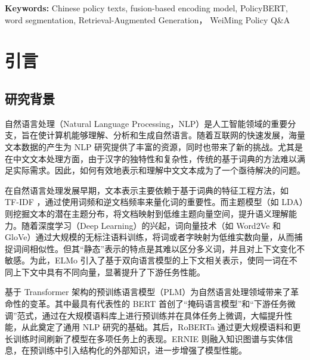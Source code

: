 \documentclass[12pt, a4paper]{ctexart}
\begin{document}
\vspace{2em} %

\textbf{Keywords:} Chinese policy texts, fusion-based encoding model, PolicyBERT, word segmentation, Retrieval-Augmented Generation， WeiMing Policy Q\&A

\newpage
\renewcommand{\cfttoctitlefont}{\hfill\Huge\bfseries} %
\renewcommand{\cftaftertoctitle}{\hfill} %
\tableofcontents %
\thispagestyle{fancy}
\newpage


\section{引言}
\subsection{研究背景}
自然语言处理（Natural Language Processing，NLP）是人工智能领域的重要分支，旨在使计算机能够理解、分析和生成自然语言。随着互联网的快速发展，海量文本数据的产生为 NLP 研究提供了丰富的资源，同时也带来了新的挑战。尤其是在中文文本处理方面，由于汉字的独特性和复杂性，传统的基于词典的方法难以满足实际需求。因此，如何有效地表示和理解中文文本成为了一个亟待解决的问题。

在自然语言处理发展早期，文本表示主要依赖于基于词典的特征工程方法，如 TF-IDF ，通过使用词频和逆文档频率来量化词的重要性\cite{SALTON1988513}。而主题模型（如 LDA）则挖掘文本的潜在主题分布，将文档映射到低维主题向量空间，提升语义理解能力\cite{10.5555/944919.944937}。随着深度学习（Deep Learning）的兴起，词向量技术（如 Word2Ve\cite{mikolov2013efficientestimationwordrepresentations} 和 GloVe\cite{pennington-etal-2014-glove}）通过大规模的无标注语料训练，将词或者字映射为低维实数向量，从而捕捉词间相似性。但其“静态”表示的特点是其难以区分多义词，并且对上下文变化不敏感。为此，ELMo 引入了基于双向语言模型的上下文相关表示，使同一词在不同上下文中具有不同向量，显著提升了下游任务性能\cite{peters-etal-2018-deep}。

基于 Transformer 架构的预训练语言模型（PLM）为自然语言处理领域带来了革命性的变革。其中最具有代表性的 BERT 首创了“掩码语言模型”和“下游任务微调”范式，通过在大规模语料库上进行预训练并在具体任务上微调，大幅提升性能，从此奠定了通用 NLP 研究的基础\cite{devlin-etal-2019-bert}。其后，RoBERTa 通过更大规模语料和更长训练时间刷新了模型在多项任务上的表现\cite{liu2019robertarobustlyoptimizedbert}。ERNIE 则融入知识图谱与实体信息，在预训练中引入结构化的外部知识，进一步增强了模型性能\cite{sun2019ernieenhancedrepresentationknowledge}。
\end{document}
